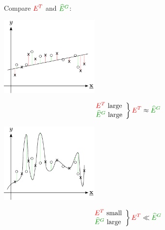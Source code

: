 \begin{frame} \frametitle{\subsecname}
Compare ${\color{red}E^T}$ and ${\color{darkgreen} \widehat E^G}$:\\

	\begin{minipage}{3.5cm}
	\begin{center}
		\includegraphics[height=4cm]{img/section1_fig28}
	\end{center}
	\pause
	\begin{equation}
			\left.
			\begin{array}{l}
			  {\color{red}E^T} \text{ large} \\
			  {\color{darkgreen} \widehat E^G} \text{ large}
			\end{array} \right \} {\color{red}E^T} \approx {\color{darkgreen} \widehat E^G}
	\end{equation}
	\end{minipage}
	\pause
	\hspace{2.5cm}
	\begin{minipage}{3.5cm}
	\begin{center}
		\includegraphics[height=4cm]{img/section1_fig30}
	\end{center}
	\pause
	\begin{equation}
			\left. \begin{array}{l}
				{\color{red}E^T} \text{ small} \\
				{\color{darkgreen} \widehat E^G} \text{ large}
			\end{array} \right \} {\color{red}E^T} \ll {\color{darkgreen}\widehat E^G}
	\end{equation}
	\end{minipage}
\end{frame}


